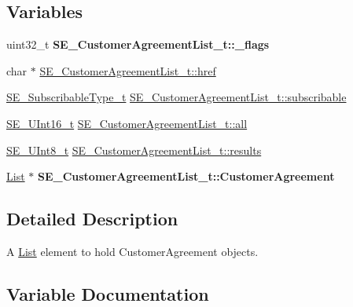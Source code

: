 \subsection*{Variables}
\begin{DoxyCompactItemize}
\item 
\mbox{\label{group__CustomerAgreementList_ga36e8e40ff56a9c0574cc0555eb3b2dee}} 
uint32\+\_\+t {\bfseries S\+E\+\_\+\+Customer\+Agreement\+List\+\_\+t\+::\+\_\+flags}
\item 
char $\ast$ \hyperlink{group__CustomerAgreementList_ga348f726fc82b6d4af27eb7766a105ab4}{S\+E\+\_\+\+Customer\+Agreement\+List\+\_\+t\+::href}
\item 
\hyperlink{group__SubscribableType_ga5c41f553d369710ed34619266bf2551e}{S\+E\+\_\+\+Subscribable\+Type\+\_\+t} \hyperlink{group__CustomerAgreementList_ga2ef2422ab3fb511245e3411e4f267c4a}{S\+E\+\_\+\+Customer\+Agreement\+List\+\_\+t\+::subscribable}
\item 
\hyperlink{group__UInt16_gac68d541f189538bfd30cfaa712d20d29}{S\+E\+\_\+\+U\+Int16\+\_\+t} \hyperlink{group__CustomerAgreementList_ga26c15d5e4f56edc2498e136d2e70a88f}{S\+E\+\_\+\+Customer\+Agreement\+List\+\_\+t\+::all}
\item 
\hyperlink{group__UInt8_gaf7c365a1acfe204e3a67c16ed44572f5}{S\+E\+\_\+\+U\+Int8\+\_\+t} \hyperlink{group__CustomerAgreementList_ga6829ab0344621b1f9cd85785fd0b972e}{S\+E\+\_\+\+Customer\+Agreement\+List\+\_\+t\+::results}
\item 
\mbox{\label{group__CustomerAgreementList_ga88bdca72665054c8cee9a139e25b2277}} 
\hyperlink{structList}{List} $\ast$ {\bfseries S\+E\+\_\+\+Customer\+Agreement\+List\+\_\+t\+::\+Customer\+Agreement}
\end{DoxyCompactItemize}


\subsection{Detailed Description}
A \hyperlink{structList}{List} element to hold Customer\+Agreement objects. 

\subsection{Variable Documentation}
\mbox{\label{group__CustomerAgreementList_ga26c15d5e4f56edc2498e136d2e70a88f}} 
